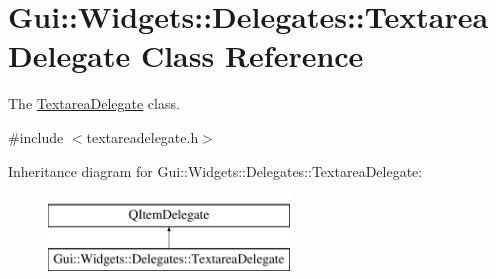 \hypertarget{classGui_1_1Widgets_1_1Delegates_1_1TextareaDelegate}{\section{Gui\-:\-:Widgets\-:\-:Delegates\-:\-:Textarea\-Delegate Class Reference}
\label{classGui_1_1Widgets_1_1Delegates_1_1TextareaDelegate}
}


The \hyperlink{classGui_1_1Widgets_1_1Delegates_1_1TextareaDelegate}{Textarea\-Delegate} class.  




{\ttfamily \#include $<$textareadelegate.\-h$>$}

Inheritance diagram for Gui\-:\-:Widgets\-:\-:Delegates\-:\-:Textarea\-Delegate\-:\begin{figure}[H]
\begin{center}
\leavevmode
\includegraphics[height=2.000000cm]{df/d9e/classGui_1_1Widgets_1_1Delegates_1_1TextareaDelegate}
\end{center}
\end{figure}
